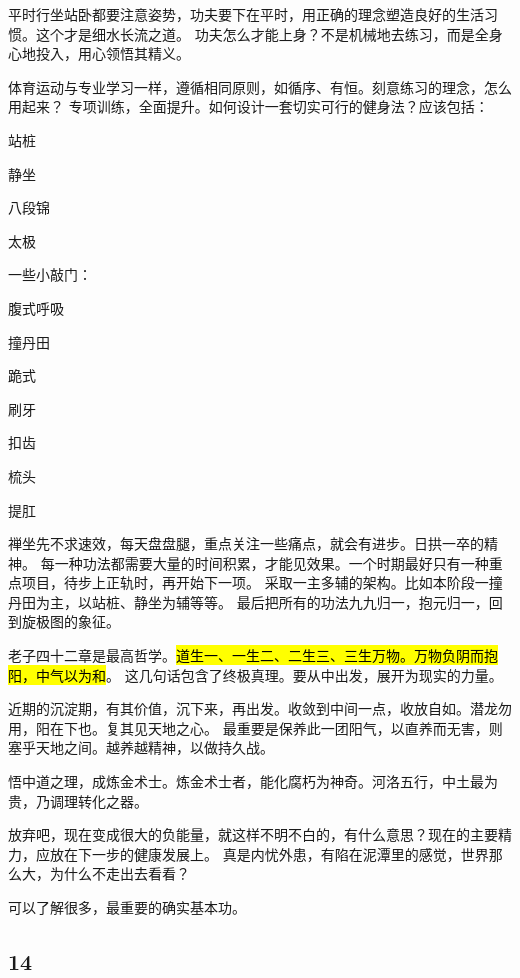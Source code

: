 平时行坐站卧都要注意姿势，功夫要下在平时，用正确的理念塑造良好的生活习惯。这个才是细水长流之道。
功夫怎么才能上身？不是机械地去练习，而是全身心地投入，用心领悟其精义。

体育运动与专业学习一样，遵循相同原则，如循序、有恒。刻意练习的理念，怎么用起来？
专项训练，全面提升。如何设计一套切实可行的健身法？应该包括：
\begin{enumbox}
\item 站桩
\item 静坐
\item 八段锦
\item 太极
\end{enumbox}

一些小敲门：
\begin{enumbox}
\item 腹式呼吸
\item 撞丹田
\item 跪式
\item 刷牙
\item 扣齿
\item 梳头
\item 提肛
\end{enumbox}

禅坐先不求速效，每天盘盘腿，重点关注一些痛点，就会有进步。日拱一卒的精神。
每一种功法都需要大量的时间积累，才能见效果。一个时期最好只有一种重点项目，待步上正轨时，再开始下一项。
采取一主多辅的架构。比如本阶段一撞丹田为主，以站桩、静坐为辅等等。
最后把所有的功法九九归一，抱元归一，回到旋极图的象征。

老子四十二章是最高哲学。\hl{道生一、一生二、二生三、三生万物。万物负阴而抱阳，中气以为和}。
这几句话包含了终极真理。要从中出发，展开为现实的力量。

近期的沉淀期，有其价值，沉下来，再出发。收敛到中间一点，收放自如。潜龙勿用，阳在下也。复其见天地之心。
最重要是保养此一团阳气，以直养而无害，则塞乎天地之间。越养越精神，以做持久战。

悟中道之理，成炼金术士。炼金术士者，能化腐朽为神奇。河洛五行，中土最为贵，乃调理转化之器。

放弃吧，现在变成很大的负能量，就这样不明不白的，有什么意思？现在的主要精力，应放在下一步的健康发展上。
真是内忧外患，有陷在泥潭里的感觉，世界那么大，为什么不走出去看看？

可以了解很多，最重要的确实基本功。

\subsection{14}

